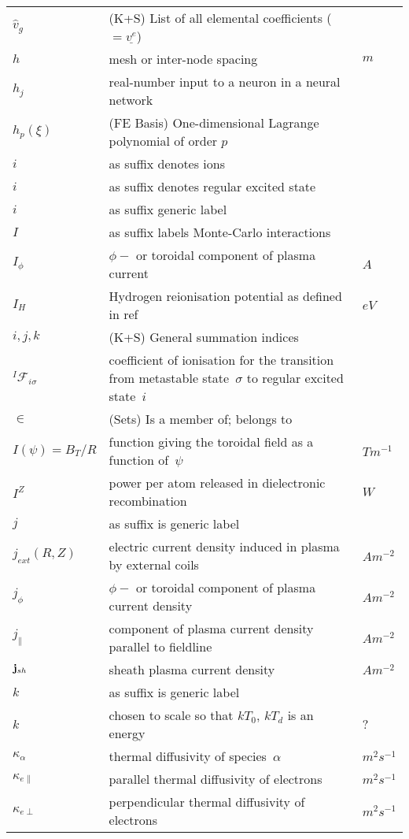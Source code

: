 \begin{longtable}{|p{3.0cm}|p{10.0cm}|p{3.0cm}|}
$\hat{v}_g$ &  (K+S) List of all elemental coefficients ($=\underline{v^e}$) & \\
$h$ & mesh or inter-node spacing & $m$ \\
$h_j$ & real-number input to a neuron in a neural network  & \\
$h_p(\xi)$ &  (FE Basis) One-dimensional Lagrange polynomial of order $p$ & \\
$i$ & as suffix denotes ions & \\
$i$ & as suffix denotes regular excited state & \\
$i$ & as suffix generic label & \\
$I$ & as suffix labels Monte-Carlo interactions & \\
$I_\phi$ & $\phi-$ or toroidal component of plasma current & $A$ \\
$I_H$ & Hydrogen reionisation potential as defined in ref~\cite{Ha13Benc} & $eV$ \\
$i,j,k$ &  (K+S) General summation indices & \\
$^I\mathcal{F}_{i\sigma}$ & coefficient of ionisation for the transition from metastable state~$\sigma$ to regular excited state~$i$ & \\
$\in$ &  (Sets) Is a member of; belongs to & \\
$I(\psi)=B_T/R$ & function giving the toroidal field as a function of~$\psi$  & $T m^{-1}$ \\
$I^Z$ & power per atom released in dielectronic recombination  & $W$ \\
$j$ & as suffix is generic label & \\
$j_{ext}(R,Z)$ & electric current density induced in plasma by external coils  & $A m^{-2}$ \\
$j_\phi$ & $\phi-$ or toroidal component of plasma current density  & $A m^{-2}$ \\
$j_{\|}$ &  component of plasma current density parallel to fieldline & $A m^{-2}$ \\
${\bf j}_{sh}$ & sheath plasma current density  & $A m^{-2}$ \\
$k$ & as suffix is generic label & \\
$k$ & chosen to scale so that $kT_0$, $kT_d$ is an energy & $?$ \\
$\kappa_\alpha$ & thermal diffusivity of species~$\alpha$ & $m^2 s^{-1}$ \\
$\kappa_{e\|}$ & parallel thermal diffusivity of electrons & $m^2 s^{-1}$ \\
$\kappa_{e\perp}$ & perpendicular thermal diffusivity of electrons & $m^2 s^{-1}$ \\

\end{longtable}
